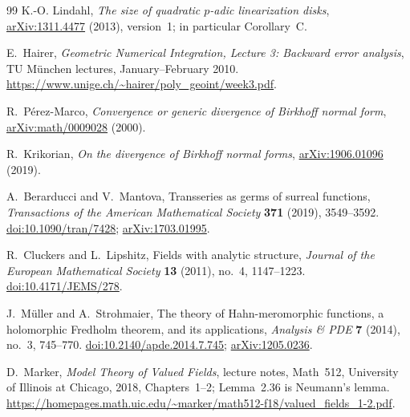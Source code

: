 \documentclass[11pt,letterpaper]{article}
\theoremstyle{definition}
\theoremstyle{remark}
\numberwithin{equation}{section}
\begin{document}
\begin{thebibliography}{99}
K.-O. Lindahl,
\emph{The size of quadratic $p$-adic linearization disks},
\href{https://arxiv.org/abs/1311.4477}{arXiv:1311.4477} (2013),
version~1; in particular Corollary~C.

E.~Hairer,
\emph{Geometric Numerical Integration, Lecture 3: Backward error
analysis}, TU M\"unchen lectures, January--February 2010.
\url{https://www.unige.ch/~hairer/poly_geoint/week3.pdf}.

R.~P\'erez-Marco,
\emph{Convergence or generic divergence of Birkhoff normal form},
\href{https://arxiv.org/abs/math/0009028}{arXiv:math/0009028} (2000).

R.~Krikorian,
\emph{On the divergence of Birkhoff normal forms},
\href{https://arxiv.org/abs/1906.01096}{arXiv:1906.01096} (2019).

A.~Berarducci and V.~Mantova,
Transseries as germs of surreal functions,
\emph{Transactions of the American Mathematical Society} \textbf{371}
(2019), 3549--3592.
\href{https://doi.org/10.1090/tran/7428}{doi:10.1090/tran/7428};
\href{https://arxiv.org/abs/1703.01995}{arXiv:1703.01995}.

R.~Cluckers and L.~Lipshitz,
Fields with analytic structure,
\emph{Journal of the European Mathematical Society} \textbf{13} (2011),
no.~4, 1147--1223.
\href{https://doi.org/10.4171/JEMS/278}{doi:10.4171/JEMS/278}.

J.~M\"uller and A.~Strohmaier,
The theory of Hahn-meromorphic functions, a holomorphic Fredholm theorem,
and its applications,
\emph{Analysis \& PDE} \textbf{7} (2014), no.~3, 745--770.
\href{https://doi.org/10.2140/apde.2014.7.745}{doi:10.2140/apde.2014.7.745};
\href{https://arxiv.org/abs/1205.0236}{arXiv:1205.0236}.

D.~Marker,
\emph{Model Theory of Valued Fields}, lecture notes, Math~512, University of
Illinois at Chicago, 2018, Chapters~1--2; Lemma~2.36 is Neumann's lemma.
\url{https://homepages.math.uic.edu/~marker/math512-f18/valued_fields_1-2.pdf}.

\end{thebibliography}
\end{document}
